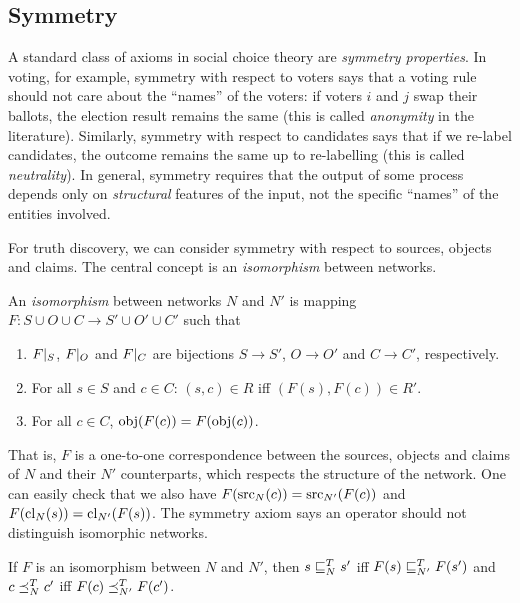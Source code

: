 \subsection{Symmetry}

A standard class of axioms in social choice theory are \emph{symmetry
properties}. In voting, for example, symmetry with respect to voters says that
a voting rule should not care about the ``names'' of the voters: if voters $i$
and $j$ swap their ballots, the election result remains the same (this is
called \emph{anonymity} in the literature). Similarly, symmetry with respect to
candidates says that if we re-label candidates, the outcome remains the same up
to re-labelling (this is called \emph{neutrality}). In general, symmetry
requires that the output of some process depends only on \emph{structural}
features of the input, not the specific ``names'' of the entities involved.

For truth discovery, we can consider symmetry with respect to sources, objects
and claims. The central concept is an \emph{isomorphism} between networks.

\begin{definition}
    An \emph{isomorphism} between networks $N$ and $N'$ is mapping $F: S \cup O
    \cup C \to S' \cup O' \cup C'$ such that
    \begin{enumerate}
        \item $F|_{S}$, $F|_{O}$ and $F|_{C}$ are
              bijections $S \to S'$, $O \to O'$ and $C \to C'$, respectively.
        \item For all $s \in S$ and $c \in C$: $(s, c) \in R$ iff $(F(s), F(c))
              \in R'$.
        \item For all $c \in C$, $\operatorname{obj}(F(c)) = F(\operatorname{obj}(c))$.
    \end{enumerate}
\end{definition}

That is, $F$ is a one-to-one correspondence between the sources, objects and
claims of $N$ and their $N'$ counterparts, which respects the structure of the
network. One can easily check that we also have $F(\operatorname{src}_N(c)) =
\operatorname{src}_{N'}(F(c))$ and $F(\operatorname{cl}_N(s)) = \operatorname{cl}_{N'}(F(s))$.
%
The symmetry axiom says an operator should not distinguish isomorphic networks.

\begin{axiom}[\symmetry{}]
    If $F$ is an isomorphism between $N$ and $N'$, then
    $s \sqsubseteq_N^T s'$ iff $F(s) \sqsubseteq_{N'}^T F(s')$ and $c \preceq_N^T c'$ iff $F(c)
    \preceq_{N'}^T F(c')$.
\end{axiom}

